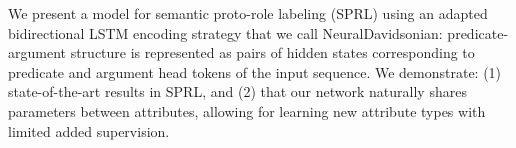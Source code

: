 We present a model for semantic proto-role labeling (SPRL) using an adapted bidirectional LSTM encoding strategy that we call NeuralDavidsonian: predicate-argument structure is represented as pairs of hidden states corresponding to predicate and argument head tokens of the input sequence. We demonstrate: (1) state-of-the-art results in SPRL, and (2) that our network naturally shares parameters between attributes, allowing for learning new attribute types with limited added supervision.
